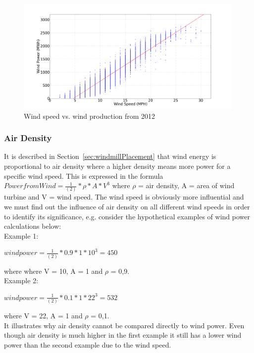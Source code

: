 \begin{figure}[H]
\centering
\includegraphics[width=0.99\textwidth]{billeder/WindSpeedVsProduction.png}
\caption{Wind speed vs. wind production from 2012}
\label{fig:windVsProd}
\end{figure}

\subsubsection{Air Density}
\label{sec:airDensity}
It is described in Section~\ref{sec:windmillPlacement} that wind energy is proportional to air density where a higher density means more power for a specific wind speed. This is expressed in the formula $Power from Wind=\frac{1}{(2)}*\rho*A*V^3$ where $\rho$ = air density, A = area of wind turbine and V = wind speed. The wind speed is obviously more influential and we must find out the influence of air density on all different wind speeds in order to identify its significance, e.g. consider the hypothetical examples of wind power calculations below:
\\[0.5cm]
\noindent Example 1:

\begin{center}
$wind power = \frac{1}{(2)}*0.9*1*10^3 = 450$
\end{center}

\noindent where where V = 10, A = 1 and $\rho$ =  0,9.
\\[0.5cm]
\noindent Example 2: 

\begin{center}
$wind power = \frac{1}{(2)}*0.1*1*22^3 = 532$
\end{center}

\noindent where V = 22, A = 1 and $\rho$ =  0,1.
\\[0.5cm]
\noindent It illustrates why air density cannot be compared directly to wind power. Even though air density is much higher in the first example it still has a lower wind power than the second example due to the wind speed.

